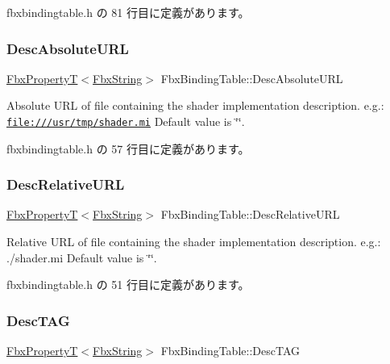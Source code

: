  fbxbindingtable.\+h の 81 行目に定義があります。

\mbox{\label{class_fbx_binding_table_ad0c914d07b49a91d79eda8d39fda6cf7}} 
\subsubsection{\texorpdfstring{Desc\+Absolute\+U\+RL}{DescAbsoluteURL}}
{\footnotesize\ttfamily \hyperlink{class_fbx_property_t}{Fbx\+PropertyT}$<$\hyperlink{class_fbx_string}{Fbx\+String}$>$ Fbx\+Binding\+Table\+::\+Desc\+Absolute\+U\+RL}

Absolute U\+RL of file containing the shader implementation description. e.\+g.\+: \href{file:///usr/tmp/shader.mi}{\tt file\+:///usr/tmp/shader.\+mi} Default value is \char`\"{}\char`\"{}. 

 fbxbindingtable.\+h の 57 行目に定義があります。

\mbox{\label{class_fbx_binding_table_acb06f75ac993d6f92788beb82298775b}} 
\subsubsection{\texorpdfstring{Desc\+Relative\+U\+RL}{DescRelativeURL}}
{\footnotesize\ttfamily \hyperlink{class_fbx_property_t}{Fbx\+PropertyT}$<$\hyperlink{class_fbx_string}{Fbx\+String}$>$ Fbx\+Binding\+Table\+::\+Desc\+Relative\+U\+RL}

Relative U\+RL of file containing the shader implementation description. e.\+g.\+: ./shader.mi Default value is \char`\"{}\char`\"{}. 

 fbxbindingtable.\+h の 51 行目に定義があります。

\mbox{\label{class_fbx_binding_table_aa1ac440c2724fdc420ec3f02fa88aede}} 
\subsubsection{\texorpdfstring{Desc\+T\+AG}{DescTAG}}
{\footnotesize\ttfamily \hyperlink{class_fbx_property_t}{Fbx\+PropertyT}$<$\hyperlink{class_fbx_string}{Fbx\+String}$>$ Fbx\+Binding\+Table\+::\+Desc\+T\+AG}

